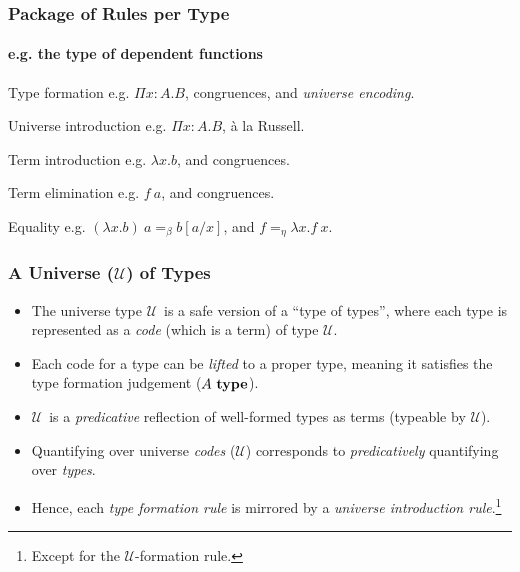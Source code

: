 \documentclass[mathserif,usenames,dvipsnames]{beamer}
\newcommand{\istype}[1]{\ensuremath{#1 ~\textbf{\textrm{type}}}}
\newcommand{\Funv}[3]{\ensuremath{\Pi #1{:}#2. #3}}
\newcommand{\Fun}[2]{\Funv{x}{#1}{#2}}
\newcommand{\funv}[2]{\ensuremath{\lambda #1. #2}}
\newcommand{\fun}[1]{\funv{x}{#1}}
\newcommand{\app}[2]{\ensuremath{#1~#2}}
\newcommand{\sub}[2]{\ensuremath{#1[#2/x]}}
\newcommand{\Type}[0]{\ensuremath{\mathcal{U}}}
\begin{document}
\begin{frame}
\frametitle{Package of Rules per Type}
\framesubtitle{e.g. the type of dependent functions}

\begin{block}{Type formation}
e.g. \Fun{A}{B}, congruences, and \textit{universe encoding}.
\end{block}

\begin{block}{Universe introduction}
e.g. \Fun{A}{B}, {\`a} la Russell.
\end{block}

\begin{block}{Term introduction}
e.g. \fun{b}, and congruences.
\end{block}

\begin{block}{Term elimination}
e.g. \app{f}{a}, and congruences.
\end{block}

\begin{block}{Equality}
  e.g. $\app{(\fun{b})}{a} =_\beta \sub{b}{a}$, and
  $f =_\eta \fun{\app{f}{x}}$.
\end{block}

\end{frame}

\begin{frame}
\frametitle{A Universe (\Type) of Types}

\begin{itemize}

\item
The universe type \Type ~is a safe version of a ``type of types'',
where each type is represented as a \textit{code}
(which is a term) of type \Type.

\item
Each code for a type can be \textit{lifted} to a proper type,
meaning it satisfies the type formation judgement (\istype{A}).

\item
\Type ~is a \textit{predicative} reflection of well-formed types
as terms (typeable by \Type).

\item
Quantifying over universe \textit{codes} (\Type) corresponds to
\textit{predicatively} quantifying over \textit{types}. 

\item
Hence, each \textit{type formation rule} is mirrored
by a \textit{universe introduction rule}.\footnote{
  Except for the \Type-formation rule.
  }

\end{itemize}

\end{frame}
\end{document}
